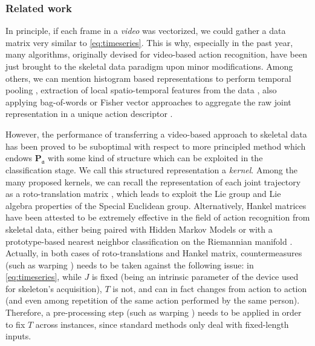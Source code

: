 \documentclass[10pt,twocolumn]{article}
\begin{document}
\subsubsection*{Related work}
In principle, if each frame in a \textit{video} was vectorized, we could gather a data matrix very similar to \eqref{eq:timeseries}. This is why, especially in the past year, many algorithms, originally devised for video-based action recognition, have been just brought to the skeletal data paradigm upon minor modifications. Among others, we can mention histogram based representations to perform temporal pooling \cite{normal,H3DJ,quads}, extraction of local spatio-temporal features from the data \cite{motraj,multibag}, also applying bag-of-words or Fisher vector approaches to aggregate the raw joint representation in a unique action descriptor \cite{quads,ela}.

However, the performance of transferring a video-based approach to skeletal data has been proved to be suboptimal with respect to more principled method which endows $\mathbf{P}_\mathfrak{a}$ with some kind of structure which can be exploited in the classification stage. We call this structured representation a \emph{kernel}. Among the many proposed kernels, we can recall the representation of each joint trajectory as a roto-translation matrix \cite{Vemulapalli:CVPR14,Vemulapalli:CVPR16,deeplie}, which leads to exploit the Lie group and Lie algebra properties of the Special Euclidean group. Alternatively, Hankel matrices \cite{Camps:ACCV14,Camps:CVPR16} have been attested to be extremely effective in the field of action recognition from skeletal data, either being paired with Hidden Markov Models \cite{Camps:ACCV14} or with a prototype-based nearest neighbor classification on the Riemannian manifold \cite{Camps:CVPR16}. Actually, in both cases of roto-translations and Hankel matrix, countermeasures (such as warping \cite{Vemulapalli:CVPR14,Vemulapalli:CVPR16}) needs to be taken against the following issue: in \eqref{eq:timeseries}, while $J$ is fixed (being an intrinsic parameter of the device used for skeleton's acquisition), $T$ is not, and can in fact changes from action to action (and even among repetition of the same action performed by the same person). Therefore, a pre-processing step (such as warping \cite{Vemulapalli:CVPR14,Vemulapalli:CVPR16}) needs to be applied in order to fix $T$ across instances, since standard methods only deal with fixed-length inputs.
\end{document}
